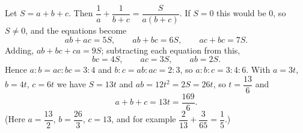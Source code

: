 Let $S=a+b+c$. Then $\dfrac1a+\dfrac1{b+c}=\dfrac{S}{a(b+c)}$. If $S=0$ this would be $0$, so $S\ne0$, and the equations become
\[ab+ac=5S,\qquad ab+bc=6S,\qquad ac+bc=7S.\]
Adding, $ab+bc+ca=9S$; subtracting each equation from this,
\[bc=4S,\qquad ac=3S,\qquad ab=2S.\]
Hence $a:b=ac:bc=3:4$ and $b:c=ab:ac=2:3$, so $a:b:c=3:4:6$. With $a=3t$, $b=4t$, $c=6t$ we have $S=13t$ and $ab=12t^2=2S=26t$, so $t=\dfrac{13}{6}$ and
\[a+b+c=13t=\boxed{\dfrac{169}{6}}.\]
(Here $a=\dfrac{13}{2}$, $b=\dfrac{26}{3}$, $c=13$, and for example $\dfrac{2}{13}+\dfrac{3}{65}=\dfrac15$.)

